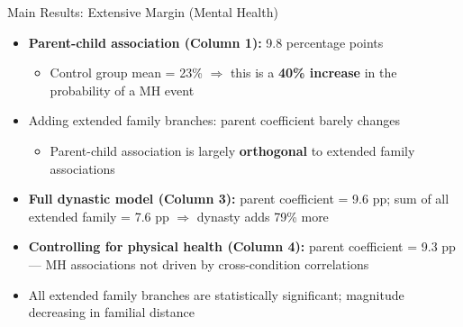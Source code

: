 \documentclass[aspectratio=169]{beamer}
\begin{document}
\begin{frame}{Main Results: Extensive Margin (Mental Health)}
  \begin{itemize}
    \item \textbf{Parent-child association (Column 1):} 9.8 percentage points
    \begin{itemize}
      \item Control group mean = 23\% $\Rightarrow$ this is a \textbf{40\% increase} in the probability of a MH event
    \end{itemize}
    \item Adding extended family branches: parent coefficient barely changes
    \begin{itemize}
      \item Parent-child association is largely \textbf{orthogonal} to extended family associations
    \end{itemize}
    \item \textbf{Full dynastic model (Column 3):} parent coefficient = 9.6 pp; sum of all extended family = 7.6 pp $\Rightarrow$ dynasty adds 79\% more
    \item \textbf{Controlling for physical health (Column 4):} parent coefficient = 9.3 pp --- MH associations not driven by cross-condition correlations
    \item All extended family branches are statistically significant; magnitude decreasing in familial distance
  \end{itemize}
\end{frame}
\end{document}
